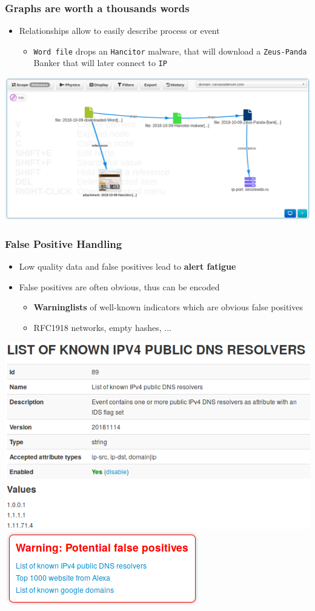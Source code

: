\begin{frame}
\frametitle{Graphs are worth a thousands words}
    \begin{itemize}
        \item Relationships allow to easily describe process or event
        \begin{itemize}
            \item \texttt{Word file} drops an \texttt{Hancitor} malware, that will download a \texttt{Zeus-Panda} Banker that will later connect to \texttt{IP}
        \end{itemize}
    \end{itemize}
    \vspace{1em}
    \includegraphics[width=1.0\linewidth]{pics/eventgraph}
\end{frame}


\begin{frame}
    \frametitle{False Positive Handling}
    \begin{itemize}
        \item Low quality data and false positives lead to {\bf alert fatigue}
        \item False positives are often obvious, thus can be encoded
        \begin{itemize}
            \item {\bf Warninglists} of well-known indicators which are obvious false positives
            \item RFC1918 networks, empty hashes, ...
        \end{itemize}
    \end{itemize}
    \vspace{1em}
    \begin{center}
        \includegraphics[width=0.49\linewidth]{pics/warning-list.png}
        \includegraphics[width=0.49\linewidth]{pics/warning-list-event.png}
    \end{center}
\end{frame}

